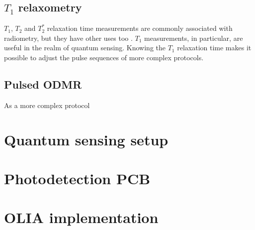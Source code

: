 \subsection{$T_1$ relaxometry}
$T_1$, $T_2$ and $T_2^*$ relaxation time measurements are commonly associated with radiometry, but they have other uses too \cite{ballinger23}. $T_1$ measurements, in particular, are useful in the realm of quantum sensing. Knowing the $T_1$ relaxation time makes it possible to adjust the pulse sequences of more complex protocols. %

\subsection{Pulsed ODMR}
As a more complex protocol

\section{Quantum sensing setup}
\section{Photodetection PCB}
\section{OLIA implementation}
